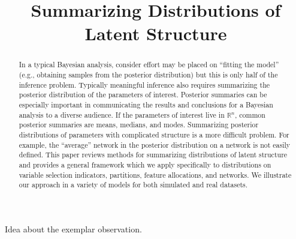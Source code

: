 \documentclass[sts]{imsart}
\begin{document}
\begin{frontmatter}

\title{Summarizing Distributions of Latent Structure}

\author{ \corref{}}
\address{}
\vspace{-1ex}

\author{ }
\address{}


\begin{abstract} In a typical Bayesian analysis, consider effort may be placed
on ``fitting the model'' (e.g., obtaining samples from the posterior
distribution) but this is only half of the inference problem.  Typically
meaningful inference also requires summarizing the posterior distribution of
the parameters of interest.  Posterior summaries can be especially important in
communicating the results and conclusions for a Bayesian analysis to a diverse
audience.  If the parameters of interest live in $\mathbb{R}^n$, common
posterior summaries are means, medians, and modes.  Summarizing posterior
distributions of parameters with complicated structure is a more difficult
problem.  For example, the ``average'' network in the posterior distribution on
a network is not easily defined.  This paper reviews methods for summarizing
distributions of latent structure and provides a general framework which we
apply specifically to distributions on variable selection indicators,
partitions, feature allocations, and networks.  We illustrate our approach in a
variety of models for both simulated and real datasets.  \end{abstract}


\begin{keyword}
\end{keyword}

\end{frontmatter}

Idea about the exemplar observation.
\end{document}
